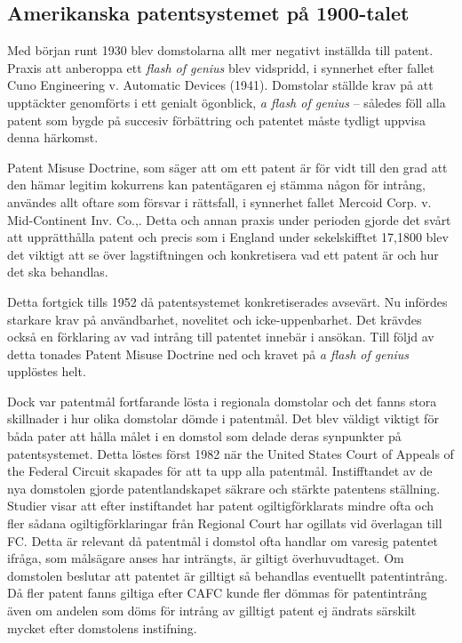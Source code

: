 \subsection{Amerikanska patentsystemet på 1900-talet} 

Med början runt 1930 blev domstolarna allt mer negativt inställda till
patent\cite{bracha}. Praxis att anberoppa ett \emph{flash of genius} blev vidspridd, i synnerhet efter fallet Cuno
Engineering v. Automatic Devices (1941). Domstolar ställde krav på att upptäckter genomförts i ett
genialt ögonblick, \emph{a flash of genius} -- således föll alla patent som bygde på succesiv förbättring och patentet måste tydligt uppvisa denna härkomst\cite{nard}. 

Patent Misuse Doctrine, som säger att om ett patent är för vidt till den grad att den hämar legitim
kokurrens kan patentägaren ej stämma någon för intrång, användes allt oftare som försvar i rättsfall, i
synnerhet fallet Mercoid Corp. v. Mid-Continent Inv. Co.,\cite{nard}. Detta och annan praxis under
perioden gjorde det svårt att upprätthålla patent och precis som i England under sekelskifftet 17,1800
blev det viktigt att se över lagstiftningen och konkretisera vad ett patent är och hur det ska behandlas.


Detta fortgick tills 1952 då patentsystemet konkretiserades avsevärt. Nu infördes
starkare krav på användbarhet, novelitet och icke-uppenbarhet. Det krävdes också en förklaring av vad
intrång till patentet innebär i ansökan. Till följd av detta tonades Patent Misuse Doctrine ned och
kravet på \emph{a flash of genius} upplöstes helt\cite{nard}.

Dock var patentmål fortfarande lösta i regionala domstolar och det fanns stora skillnader i hur olika
domstolar dömde i patentmål\cite{nard}. Det blev väldigt viktigt för båda pater att hålla målet i en
domstol som delade deras synpunkter på patentsystemet. Detta löstes först 1982 när the United States
Court of Appeals of the Federal Circuit skapades för att ta upp alla patentmål\cite{nard}. Instifftandet
av de nya domstolen gjorde patentlandskapet säkrare och stärkte patentens ställning. Studier visar att
efter instiftandet har patent ogiltigförklarats mindre ofta och fler sådana ogiltigförklaringar från
Regional Court har ogillats vid överlagan till FC. \cite{henry} Detta är relevant då patentmål i domstol
ofta handlar om varesig patentet ifråga, som målsägare anses har inträngts, är giltigt överhuvudtaget.
Om domstolen beslutar att patentet är gilltigt så behandlas eventuellt patentintrång. Då fler patent
fanns giltiga efter CAFC kunde fler dömmas för patentintrång även om andelen som döms för intrång av
gilltigt patent ej ändrats särskilt mycket efter domstolens instifning. 

